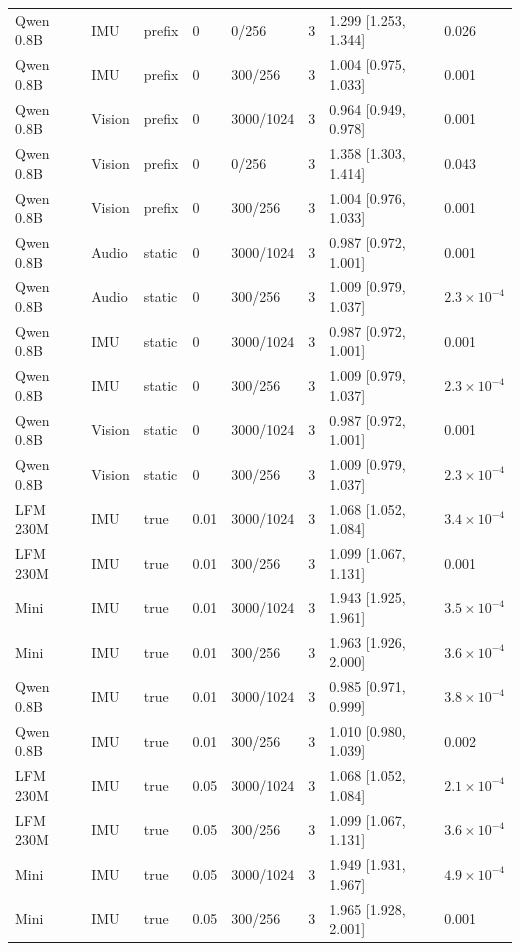 {\begin{longtable}{@{}llllllll@{}}
Qwen 0.8B & IMU & prefix & 0 & 0/256 & 3 & 1.299 [1.253, 1.344] & 0.026 \\
Qwen 0.8B & IMU & prefix & 0 & 300/256 & 3 & 1.004 [0.975, 1.033] & 0.001 \\
Qwen 0.8B & Vision & prefix & 0 & 3000/1024 & 3 & 0.964 [0.949, 0.978] & 0.001 \\
Qwen 0.8B & Vision & prefix & 0 & 0/256 & 3 & 1.358 [1.303, 1.414] & 0.043 \\
Qwen 0.8B & Vision & prefix & 0 & 300/256 & 3 & 1.004 [0.976, 1.033] & 0.001 \\
Qwen 0.8B & Audio & static & 0 & 3000/1024 & 3 & 0.987 [0.972, 1.001] & 0.001 \\
Qwen 0.8B & Audio & static & 0 & 300/256 & 3 & 1.009 [0.979, 1.037] & $2.3\times10^{-4}$ \\
Qwen 0.8B & IMU & static & 0 & 3000/1024 & 3 & 0.987 [0.972, 1.001] & 0.001 \\
Qwen 0.8B & IMU & static & 0 & 300/256 & 3 & 1.009 [0.979, 1.037] & $2.3\times10^{-4}$ \\
Qwen 0.8B & Vision & static & 0 & 3000/1024 & 3 & 0.987 [0.972, 1.001] & 0.001 \\
Qwen 0.8B & Vision & static & 0 & 300/256 & 3 & 1.009 [0.979, 1.037] & $2.3\times10^{-4}$ \\
LFM 230M & IMU & true & 0.01 & 3000/1024 & 3 & 1.068 [1.052, 1.084] & $3.4\times10^{-4}$ \\
LFM 230M & IMU & true & 0.01 & 300/256 & 3 & 1.099 [1.067, 1.131] & 0.001 \\
Mini & IMU & true & 0.01 & 3000/1024 & 3 & 1.943 [1.925, 1.961] & $3.5\times10^{-4}$ \\
Mini & IMU & true & 0.01 & 300/256 & 3 & 1.963 [1.926, 2.000] & $3.6\times10^{-4}$ \\
Qwen 0.8B & IMU & true & 0.01 & 3000/1024 & 3 & 0.985 [0.971, 0.999] & $3.8\times10^{-4}$ \\
Qwen 0.8B & IMU & true & 0.01 & 300/256 & 3 & 1.010 [0.980, 1.039] & 0.002 \\
LFM 230M & IMU & true & 0.05 & 3000/1024 & 3 & 1.068 [1.052, 1.084] & $2.1\times10^{-4}$ \\
LFM 230M & IMU & true & 0.05 & 300/256 & 3 & 1.099 [1.067, 1.131] & $3.6\times10^{-4}$ \\
Mini & IMU & true & 0.05 & 3000/1024 & 3 & 1.949 [1.931, 1.967] & $4.9\times10^{-4}$ \\
Mini & IMU & true & 0.05 & 300/256 & 3 & 1.965 [1.928, 2.001] & 0.001 \\

\end{longtable}}
